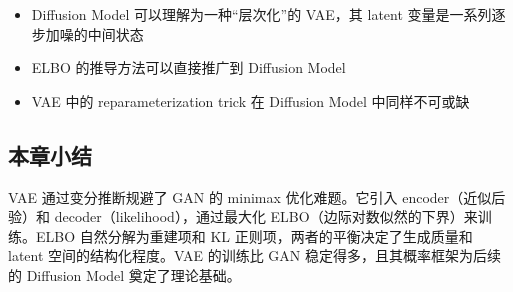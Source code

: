 \begin{itemize}
    \item Diffusion Model 可以理解为一种``层次化''的 VAE，其 latent 变量是一系列逐步加噪的中间状态
    \item ELBO 的推导方法可以直接推广到 Diffusion Model
    \item VAE 中的 reparameterization trick 在 Diffusion Model 中同样不可或缺
\end{itemize}

\subsection{本章小结}

VAE 通过变分推断规避了 GAN 的 minimax 优化难题。它引入 encoder（近似后验）和 decoder（likelihood），通过最大化 ELBO（边际对数似然的下界）来训练。ELBO 自然分解为重建项和 KL 正则项，两者的平衡决定了生成质量和 latent 空间的结构化程度。VAE 的训练比 GAN 稳定得多，且其概率框架为后续的 Diffusion Model 奠定了理论基础。

\newpage
